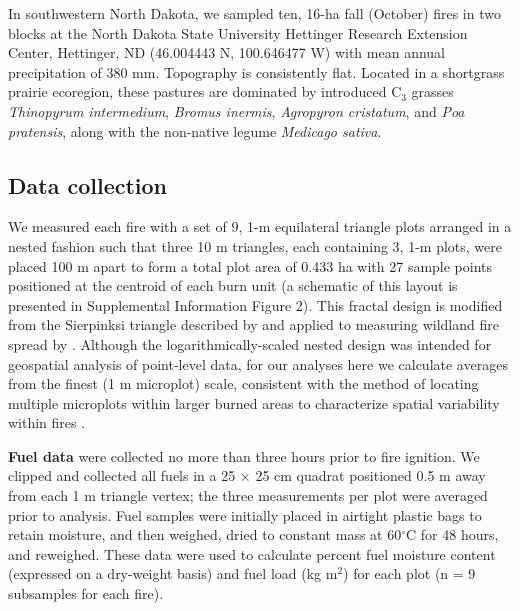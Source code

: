 \documentclass[referee, 
		     sn-basic]{sn-jnl}
\begin{document}
\begin{linenumbers}
In southwestern North Dakota, we sampled ten, 16-ha fall (October) fires
in two blocks at the North Dakota State University Hettinger Research
Extension Center, Hettinger, ND (46.004443 N, 100.646477 W) with mean
annual precipitation of 380 mm. Topography is consistently flat. Located
in a shortgrass prairie ecoregion, these pastures are dominated by
introduced C\(_3\) grasses \emph{Thinopyrum intermedium}, \emph{Bromus
inermis}, \emph{Agropyron cristatum}, and \emph{Poa pratensis}, along
with the non-native legume \emph{Medicago sativa}.

\hypertarget{data-collection}{%
\subsection{Data collection}\label{data-collection}}

We measured each fire with a set of 9, 1-m equilateral triangle plots
arranged in a nested fashion such that three 10 m triangles, each
containing 3, 1-m plots, were placed 100 m apart to form a total plot
area of 0.433 ha with 27 sample points positioned at the centroid of
each burn unit (a schematic of this layout is presented in Supplemental
Information Figure 2). This fractal design is modified from the
Sierpinksi triangle described by \citet{dorrough2007} and applied to
measuring wildland fire spread by \citet{mcgranahan2021b}. Although the
logarithmically-scaled nested design was intended for geospatial
analysis of point-level data, for our analyses here we calculate
averages from the finest (1 m microplot) scale, consistent with the
method of locating multiple microplots within larger burned areas to
characterize spatial variability within fires \citep{fernandes2000}.

\textbf{Fuel data} were collected no more than three hours prior to fire
ignition. We clipped and collected all fuels in a 25 × 25 cm quadrat
positioned 0.5 m away from each 1 m triangle vertex; the three
measurements per plot were averaged prior to analysis. Fuel samples were
initially placed in airtight plastic bags to retain moisture, and then
weighed, dried to constant mass at 60\(^\circ\)C for 48 hours, and
reweighed. These data were used to calculate percent fuel moisture
content (expressed on a dry-weight basis) and fuel load (kg m\(^{2}\))
for each plot (n = 9 subsamples for each fire).


\end{linenumbers}
\end{document}
